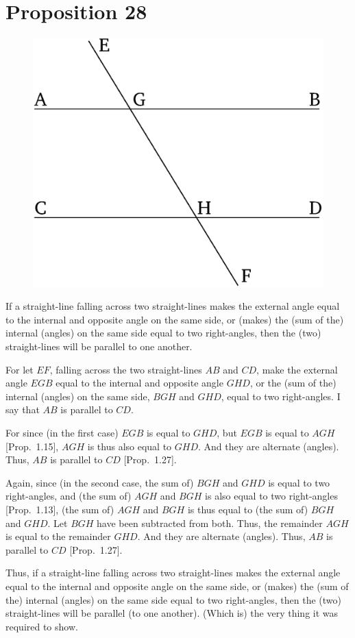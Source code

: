 \chapter*{Proposition 28}



\begin{figure}[ht]
    \begin{center}
    \includegraphics[width=0.5\linewidth]{figures/fig28e.eps}
    \label{fig:prop_28}
    \end{center}
\end{figure}

If a straight-line falling across two straight-lines makes the external angle equal
to the internal and opposite angle on the same side, or (makes) the (sum  of the) internal
(angles) on the same side equal
to two right-angles, then the (two) straight-lines will be parallel to
one another.

For let $EF$, falling across the two straight-lines $AB$ and $CD$, make the external
angle $EGB$ equal to the internal and opposite angle $GHD$, or the (sum of the) internal
(angles) on the same side, $BGH$ and $GHD$, equal to two right-angles.
I say that $AB$ is parallel to $CD$.

For since (in the first case) $EGB$ is equal to $GHD$, but $EGB$ is equal to $AGH$ [Prop.~1.15],
$AGH$ is thus also equal to $GHD$. And they are alternate (angles).
Thus, $AB$ is
 parallel to $CD$ [Prop.~1.27].
 
Again, since (in the second case, the sum of) $BGH$ and $GHD$ is equal to two right-angles,  and (the sum of) $AGH$ and
$BGH$ is also equal to two right-angles [Prop.~1.13], 
(the sum of) $AGH$ and $BGH$ is thus equal to (the sum of) $BGH$ and $GHD$. Let $BGH$ have been
subtracted from both. Thus, the remainder $AGH$ is equal to the remainder
$GHD$. And they are alternate (angles). Thus, $AB$ is parallel
to $CD$ [Prop.~1.27].

Thus, if a straight-line falling across  two straight-lines makes the external angle equal
to the internal and opposite angle on the same side, or (makes) the (sum of the) internal
(angles) on the same side equal
to two right-angles, then the (two) straight-lines will be parallel (to
one another). (Which is) the very thing it was required to show.


